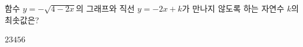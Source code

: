 \hspace*{2mm}\begin{minipage}[t]{\dimexpr\linewidth-2mm\relax}\vspace{0pt}
함수 $y=-\sqrt{4-2x}$의 그래프와 직선 $y=-2x+k$가 만나지 않도록 하는 자연수 $k$의 최솟값은?
\begin{choices32}{$2$}{$3$}{$4$}{$5$}{$6$}\end{choices32}\end{minipage}
